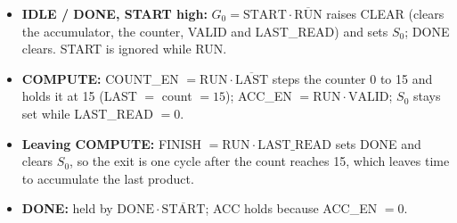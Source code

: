 \documentclass[10pt,letterpaper]{article}
\begin{document}
\begin{itemize}\setlength{\itemsep}{0pt}\setlength{\topsep}{0pt}
\item \textbf{IDLE / DONE, START high:} $G_0=\mathrm{START}\cdot\overline{\mathrm{RUN}}$ raises CLEAR (clears the accumulator, the counter, VALID and LAST\_READ) and sets $S_0$; DONE clears. START is ignored while RUN.
\item \textbf{COMPUTE:} COUNT\_EN $=\mathrm{RUN}\cdot\overline{\mathrm{LAST}}$ steps the counter 0 to 15 and holds it at 15 (LAST $=$ count $=15$); ACC\_EN $=\mathrm{RUN}\cdot\mathrm{VALID}$; $S_0$ stays set while LAST\_READ $=0$.
\item \textbf{Leaving COMPUTE:} FINISH $=\mathrm{RUN}\cdot\mathrm{LAST\_READ}$ sets DONE and clears $S_0$, so the exit is one cycle after the count reaches 15, which leaves time to accumulate the last product.
\item \textbf{DONE:} held by $\mathrm{DONE}\cdot\overline{\mathrm{START}}$; ACC holds because ACC\_EN $=0$.
\end{itemize}
\end{document}
